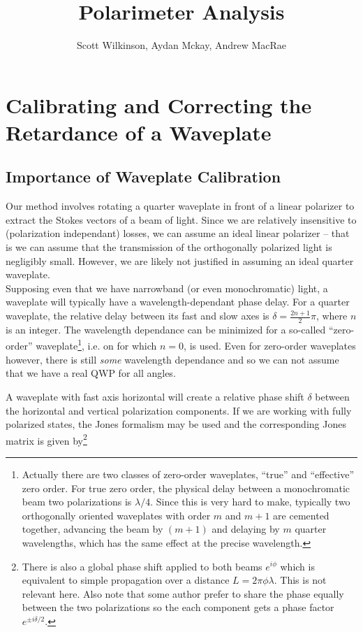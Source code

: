 \documentclass{article}
\title{Polarimeter Analysis}
\date{}
\author{Scott Wilkinson, Aydan Mckay, Andrew MacRae}
\begin{document}
\setcounter{section}{0}
\maketitle


\section{Calibrating and Correcting the Retardance of a Waveplate}
\subsection{Importance of Waveplate Calibration}
Our method involves rotating a quarter waveplate in front of a linear polarizer to extract the Stokes vectors of a beam of light. Since we are relatively insensitive to (polarization independant) losses, we can assume an ideal linear polarizer -- that is we can assume that the transmission of the orthogonally polarized light is negligibly small. However, we are likely not justified in assuming an ideal quarter waveplate. \\

Supposing even that we have narrowband (or even monochromatic) light, a waveplate will typically have a wavelength-dependant phase delay. For a quarter waveplate, the relative delay between its fast and slow axes is $\delta = \frac{2n+1}{2}\pi$, where $n$ is an integer. The wavelength dependance can be minimized for a so-called ``zero-order'' waveplate\footnote{Actually there are two classes of zero-order waveplates, ``true'' and ``effective'' zero order. For true zero order, the physical delay between a monochromatic beam two polarizations is $\lambda/4$. Since this is very hard to make, typically two orthogonally oriented waveplates with order $m$ and $m+1$ are cemented together, advancing the beam by $(m+1)$ and delaying by $m$ quarter wavelengths, which has the same effect at the precise wavelength.}, i.e. on for which $n=0$, is used. Even for zero-order waveplates however, there is still \textit{some} wavelength dependance and so we can not assume that we have a real QWP for all angles. 

A waveplate with fast axis horizontal will create a relative phase shift $\delta$ between the horizontal and vertical polarization components. If we are working with fully polarized states, the Jones formalism may be used and the corresponding Jones matrix is given by\footnote{There is also a global phase shift applied to both beams $e^{i\phi}$ which is equivalent to simple propagation over a distance $L = 2\pi\phi\lambda$. This is not relevant here. Also note that some author prefer to share the phase equally between the two polarizations so the each component gets a phase factor $e^{\pm i \delta/2}$.}
\end{document}
